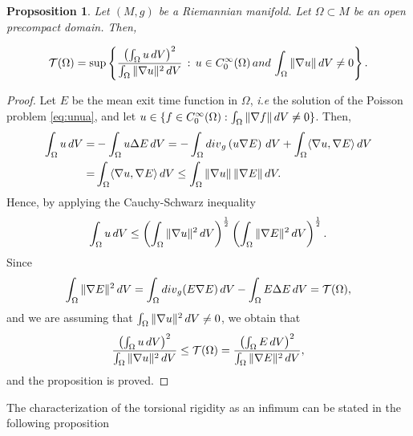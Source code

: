 \documentclass{amsart}
\newtheorem{proposition}[theorem]{Propsosition}
\theoremstyle{definition}
\theoremstyle{remark}
\newcommand{\V}{{\rm V}}
\begin{document}
\begin{proposition}\label{prop:upper_bounds_torsion}Let $(M,g)$ be a Riemannian manifold.  Let $\Omega\subset M$ be an open precompact domain.    Then,
    
    \begin{equation*}
        \mathcal{T}(\Omega) = \sup\left\lbrace  \frac{\left(\int_\Omega  u\, {d}\V\right)^2}{\int_\Omega \Vert \nabla u\Vert^2\, { d}\V} \, :\,  u\in C^{\infty}_0(\Omega)\, {\rm and}\, 
         \int_\Omega \Vert \nabla u\Vert\, { d}\V\neq 0
    \right\rbrace.
    \end{equation*}
\end{proposition}
\begin{proof}
Let $E$ be the mean exit time function in $\Omega$, \emph{i.e} the solution of the Poisson problem \eqref{eq:unua},  and let $u\in \{ f\in C^{\infty}_0(\Omega) : \int_\Omega \Vert \nabla f\Vert\, {d}\V\neq 0\}$. Then,
    \begin{equation}\label{eq:3nov}
    \begin{aligned}
        \int _\Omega u\, { d}\V=&-\int_\Omega u\Delta E\, { d}\V=-\int_\Omega{\rm div}_g\left(u\nabla E\right)\, {d}\V+\int_\Omega\langle\nabla u,\nabla E\rangle\, { d}\V\\
        =&\int_\Omega\langle\nabla u,\nabla E\rangle\, { d}\V\leq \int_\Omega\Vert\nabla u\Vert \, \Vert \nabla E\Vert\,  {d}\V. 
    \end{aligned}
    \end{equation}
    Hence, by applying the Cauchy-Schwarz inequality 
    $$
\int_\Omega u\, {d}\V\leq \left(\int_\Omega\Vert\nabla u\Vert^2 \,  {d}\V\right)^{\frac{1}{2}}\left(\int_\Omega \Vert \nabla E\Vert^2\,  {d}\V\right)^{\frac{1}{2}}.
    $$
    Since
    $$
\int_\Omega \Vert \nabla E\Vert^2\, d{\rm V} =\int_\Omega {\rm div}_g(E\nabla E)\, d{\rm V}-\int_\Omega E\Delta E\, d{\rm V}=\mathcal{T}(\Omega),
    $$
    and we are assuming that $\int_\Omega\Vert\nabla u\Vert^2 \,  { d}\V\neq 0$, we obtain that 
    $$
\frac{\left(\int_\Omega  u\, {d}\V\right)^2}{\int_\Omega \Vert \nabla u\Vert^2\, {d}\V}\leq \mathcal{T}(\Omega)=\frac{\left(\int_\Omega  E\, {d}\V\right)^2}{\int_\Omega \Vert \nabla E\Vert^2\, { d}\V},
    $$
    and the proposition is proved.
 \end{proof}
 
The characterization of the torsional rigidity as an infimum can be stated in the following proposition
\end{document}
